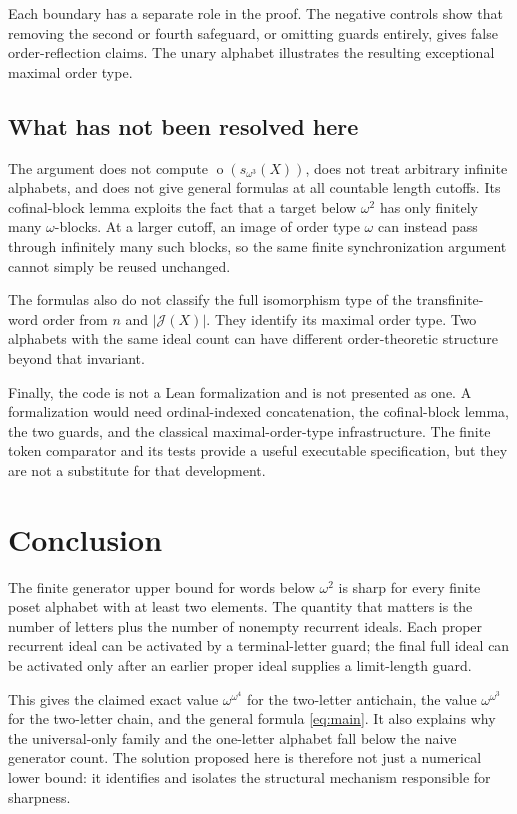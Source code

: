 \documentclass[11pt]{article}
\numberwithin{equation}{section}
\theoremstyle{plain}
\theoremstyle{definition}
\theoremstyle{remark}
\newcommand{\ot}{\operatorname{o}}
\newcommand{\J}{\mathcal J}
\begin{document}
Each boundary has a separate role in the proof. The negative controls show that removing the second or fourth safeguard, or omitting guards entirely, gives false order-reflection claims. The unary alphabet illustrates the resulting exceptional maximal order type.

\subsection{What has not been resolved here}

The argument does not compute $\ot(s_{\omega^3}(X))$, does not treat arbitrary infinite alphabets, and does not give general formulas at all countable length cutoffs. Its cofinal-block lemma exploits the fact that a target below $\omega^2$ has only finitely many $\omega$-blocks. At a larger cutoff, an image of order type $\omega$ can instead pass through infinitely many such blocks, so the same finite synchronization argument cannot simply be reused unchanged.

The formulas also do not classify the full isomorphism type of the transfinite-word order from $n$ and $|\J(X)|$. They identify its maximal order type. Two alphabets with the same ideal count can have different order-theoretic structure beyond that invariant.

Finally, the code is not a Lean formalization and is not presented as one. A formalization would need ordinal-indexed concatenation, the cofinal-block lemma, the two guards, and the classical maximal-order-type infrastructure. The finite token comparator and its tests provide a useful executable specification, but they are not a substitute for that development.

\section{Conclusion}

The finite generator upper bound for words below $\omega^2$ is sharp for every finite poset alphabet with at least two elements. The quantity that matters is the number of letters plus the number of nonempty recurrent ideals. Each proper recurrent ideal can be activated by a terminal-letter guard; the final full ideal can be activated only after an earlier proper ideal supplies a limit-length guard.

This gives the claimed exact value $\omega^{\omega^4}$ for the two-letter antichain, the value $\omega^{\omega^3}$ for the two-letter chain, and the general formula \eqref{eq:main}. It also explains why the universal-only family and the one-letter alphabet fall below the naive generator count. The solution proposed here is therefore not just a numerical lower bound: it identifies and isolates the structural mechanism responsible for sharpness.
\end{document}
